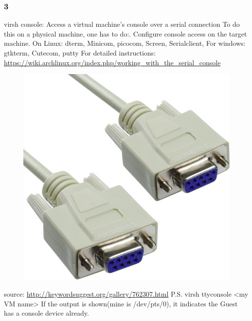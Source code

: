 \documentclass{article}
\begin{document}
    \subsubsection{3}
    virsh console: Access a virtual machine's console over a serial connection\newline
    To do this on a physical machine, one has to do:. Configure console access on the target machine. On Linux: dterm, Minicom, picocom, Screen, Serialclient, For windows: gtkterm, Cutecom, putty\newline
    For detailed instructions: \url{https://wiki.archlinux.org/index.php/working_with_the_serial_console}
     \begin{figure}[!htb]
            \begin{flushleft}
            \includegraphics[scale=0.25]{screenshot.png}
            \end{flushleft}
    \end{figure}

    source: \url{http://keywordsuggest.org/gallery/762307.html}
    \newline P.S.\newline
    virsh ttyconsole <my VM name>\newline
    If the output is shown(mine is /dev/pts/0), it indicates the Guest has a console device already.
\end{document}
